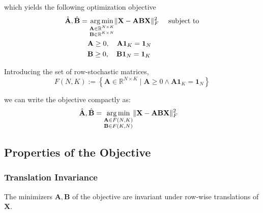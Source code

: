 \documentclass[oneside]{article}
\DeclareMathOperator*{\argmin}{arg\,min}
\begin{document}
which yields the following optimization objective
\begin{equation}
\label{eq:objective}
    \begin{aligned}
        \hat{\mathbf{A}}, \hat{\mathbf{B}} =& \; \underset{\begin{subarray}{c} \mathbf{A} \in \mathbb{R}^{N \times K} \\
        \mathbf{B} \in \mathbb{R}^{K \times N} \end{subarray}}{\argmin} \| \mathbf{X} - \mathbf{A} \mathbf{B} \mathbf{X}\|_F^2 \quad \text{ subject to} \\
        & \mathbf{A} \geq 0, \quad \mathbf{A} \mathbf{1}_K = \mathbf{1}_N \\
        & \mathbf{B} \geq 0, \quad \mathbf{B} \mathbf{1}_N = \mathbf{1}_K
    \end{aligned}
\end{equation}

Introducing the set of row-stochastic matrices,
\begin{equation}
    F(N, K) := \left\{ \mathbf{A} \in \mathbb{R}^{N \times K} \mid  \mathbf{A} \geq 0 \land \mathbf{A} \mathbf{1}_K = \mathbf{1}_N \right\}
\end{equation}

we can write the objective compactly as:
\begin{equation}
    \begin{aligned}
    \hat{\mathbf{A}}, \hat{\mathbf{B}} =& \; \underset{\begin{subarray}{c} \mathbf{A} \in F(N, K) \\
        \mathbf{B} \in F(K, N) \end{subarray}}{\argmin} \| \mathbf{X} - \mathbf{A} \mathbf{B} \mathbf{X}\|_F^2
    \end{aligned}
\end{equation}

\subsection{Properties of the Objective}

\subsubsection{Translation Invariance}
\label{subsubsec:translation_invariance}

The minimizers $\mathbf{A}, \mathbf{B}$ of the objective are invariant under row-wise translations of $\mathbf{X}$.
\end{document}
